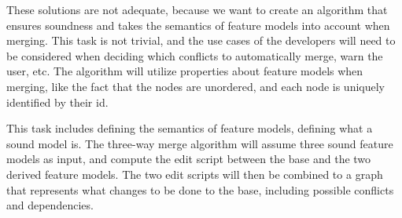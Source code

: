 \documentclass[a4paper,english]{ifimaster}
\begin{document}
These solutions are not adequate, because we want to create an algorithm that ensures soundness and takes the semantics of feature models into account when merging. This task is not trivial, and the use cases of the developers will need to be considered when deciding which conflicts to automatically merge, warn the user, etc. The algorithm will utilize properties about feature models when merging, like the fact that the nodes are unordered, and each node is uniquely identified by their id.

This task includes defining the semantics of feature models, defining what a sound model is. The three-way merge algorithm will assume three sound feature models as input, and compute the edit script between the base and the two derived feature models. The two edit scripts will then be combined to a graph that represents what changes to be done to the base, including possible conflicts and dependencies.


\backmatter{}

\printbibliography{}
\end{document}
